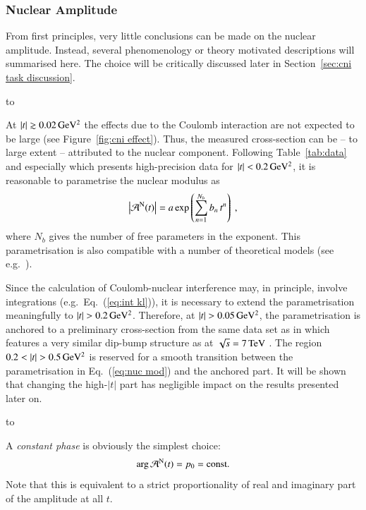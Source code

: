 \subsubsection{Nuclear Amplitude}
\label{sec:cni nuclear}

From first principles, very little conclusions can be made on the nuclear amplitude. Instead, several phenomenology or theory motivated descriptions will summarised here. The choice will be critically discussed later in Section~\ref{sec:cni task discussion}.

\vskip3mm
\hbox to

At $|t| \gtrsim 0.02\,{\rm GeV^2}$ the effects due to the Coulomb interaction are not expected to be large (see Figure~\ref{fig:cni effect}). Thus, the measured cross-section can be -- to large extent -- attributed to the nuclear component. Following Table~\ref{tab:data} and especially \cite{8tev-90m} which presents high-precision data for $|t| < 0.2\,{\rm GeV^2}$, it is reasonable to parametrise the nuclear modulus as
\begin{equation}
\label{eq:nuc mod}
\left | {\cal A}^{\rm N}(t) \right | = a \exp\left( \sum\limits_{n = 1}^{N_b} b_n\, t^n \right)\ ,
\end{equation}
where $N_b$ gives the number of free parameters in the exponent. This parametrisation is also compatible with a number of theoretical models (see e.g.~\cite{elegent}).

Since the calculation of Coulomb-nuclear interference may, in principle, involve integrations (e.g.~Eq.~(\ref{eq:int kl})), it is necessary to extend the parametrisation meaningfully to $|t| > 0.2\,{\rm GeV^2}$. Therefore, at $|t| > 0.05\,{\rm GeV^2}$, the parametrisation is anchored to a preliminary cross-section from the same data set as in \cite{8tev-90m} which features a very similar dip-bump structure as at $\sqrt{s} = 7\,{\rm TeV}$ \cite{epl95}. The region $0.2 < |t| > 0.5\,{\rm GeV^2}$ is reserved for a smooth transition between the parametrisation in Eq.~(\ref{eq:nuc mod}) and the anchored part. It will be shown that changing the high-$|t|$ part has negligible impact on the results presented later on.


\vskip3mm
\hbox to

A {\it constant phase} is obviously the simplest choice:
\begin{equation}
\label{eq:nuc phase con}
\arg {\cal A}^{\rm N}(t) = p_0 = \hbox{const.}
\end{equation}
Note that this is equivalent to a strict proportionality of real and imaginary part of the amplitude at all $t$.

